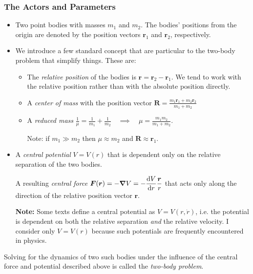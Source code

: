 \documentclass[11pt, a4paper]{article}
\begin{document}
\subsubsection{The Actors and Parameters}
\begin{itemize}
	\item Two point bodies with masses $ m_1 $ and $ m_2 $. The bodies' positions from the origin are denoted by the position vectors $ \bm{r}_1 $ and $ \bm{r}_2 $, respectively.
	
	\item We introduce a few standard concept that are particular to the two-body problem that simplify things. These are:
	\begin{itemize}
		\item The \textit{relative position} of the bodies is $ \bm{r} = \bm{r}_2 - \bm{r}_1 $. We tend to work with the relative position rather than with the absolute position directly.
		
		\item A \textit{center of mass} with the position vector $ \displaystyle{\bm{R} = \frac{m_1 \bm{r}_1 + m_2 \bm{r}_2}{m_1 + m_2}} $ 
		
		\item A \textit{reduced mass} $ \displaystyle{\frac{1}{\mu} = \frac{1}{m_1} + \frac{1}{m_2} \quad \implies \quad \mu = \frac{m_1 m_2}{m_1 + m_2}} $.
		
		Note: if $ m_1 \gg m_2 $ then $ \mu \approx m_2 $ and $ \bm{R} \approx \bm{r}_1 $.
	\end{itemize}
	
	\item A \textit{central potential} $ V = V(r) $ that is dependent only on the relative separation of the two bodies.
	
	A resulting \textit{central force} $ \displaystyle{\bm{F} (\bm{r}) =  -\grad{V} = - \dv{V}{r} \frac{\bm{r}}{r}}$ that acts only along the direction of the relative position vector $ \bm{r} $.
	
	\textbf{Note:} Some texts define a central potential as $ V = V(r, \dot{r}) $, i.e. the potential is dependent on both the relative separation \textit{and} the relative velocity. I consider only $ V = V(r) $ because such potentials are frequently encountered in physics. 

\end{itemize}

Solving for the dynamics of two such bodies under the influence of the central force and potential described above is called the \textit{two-body problem}.
\end{document}

